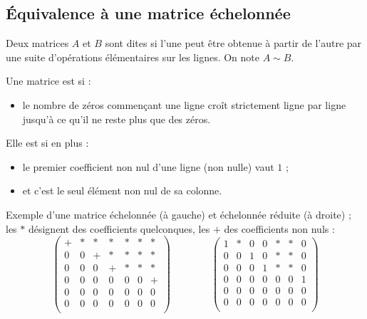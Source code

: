 \documentclass[class=report,crop=false]{standalone}
\begin{document}
\subsection{\'Equivalence à une matrice échelonnée}


\begin{definition}
Deux matrices $A$ et $B$ sont dites  si l'une
peut être obtenue à partir de l'autre par une suite d'opérations
élémentaires sur les lignes. On note $A \sim B$.
\end{definition}

\begin{definition}
Une matrice est  si :
\begin{itemize}
  \item le nombre de zéros commençant une ligne croît strictement ligne par ligne
  jusqu'à ce qu'il ne reste plus que des zéros.
\end{itemize}

Elle est  si en plus :
\begin{itemize}
\setcounter{enumi}{1}
  \item le premier coefficient non nul d'une ligne (non nulle) vaut $1$ ;

  \item et c'est le seul élément non nul de sa colonne.
\end{itemize}
\end{definition}

Exemple d'une matrice échelonnée (à gauche) et échelonnée réduite (à droite) ;
les $*$ désignent des coefficients quelconques, les $+$ des coefficients non nuls :
$$
\begin{pmatrix}
+ & * & * & * & * & * & * \\
0 & 0 & + & * & * & * & * \\
0 & 0 & 0 & + & * & * & * \\
0 & 0 & 0 & 0 & 0 & 0 & + \\
0 & 0 & 0 & 0 & 0 & 0 & 0 \\
0 & 0 & 0 & 0 & 0 & 0 & 0 \\
\end{pmatrix}
\qquad \qquad
\begin{pmatrix}
1 & * & 0 & 0 & * & * & 0 \\
0 & 0 & 1 & 0 & * & * & 0 \\
0 & 0 & 0 & 1 & * & * & 0 \\
0 & 0 & 0 & 0 & 0 & 0 & 1 \\
0 & 0 & 0 & 0 & 0 & 0 & 0 \\
0 & 0 & 0 & 0 & 0 & 0 & 0 \\
\end{pmatrix}
$$
\end{document}
